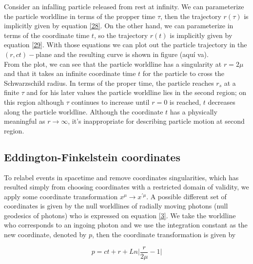 \documentclass[letterpaper,11pt,onecolumn]{article}
\begin{document}
Consider an infalling particle released from rest at infinity. We can parameterize the particle worldline in terms of the propper time $\tau$, then the trajectory $r(\tau)$ is implicitly given by equation \ref{28}. On the other hand, we can parameterize in terms of the coordinate time $t$, so the trajectory $r(t)$ is implicitly given by equation \ref{29}. With those equations we can plot out the particle trajectory in the $(r,ct)-$plane and the resulting curve is shown in figure (aquí va). \\
From the plot, we can see that the particle worldline has a singularity at $r=2\mu$ and that it takes an infinite coordinate time $t$ for the particle
to cross the Schwarzschild radius. In terms of the proper time, the particle reaches $r_s$ at a finite $\tau$ and for his later values the particle worldline lies in the second region; on this region although $\tau$ continues to increase until $r=0$ is reached,  $t$ decreases along the particle worldline. Although the coordinate $t$ has a physically meaningful as $r\rightarrow \infty$, it's inappropriate for describing particle motion at second region.

\subsection{Eddington-Finkelstein coordinates}

To relabel events in spacetime and remove coordinates singularities, which has resulted simply from choosing coordinates with a restricted domain of validity, we apply some coordinate transformation $x^{\mu}\rightarrow x^{'\mu}$. A possible different set of coordinates is given by the null worldlines of radially moving photons (null geodesics of photons) who is expressed on equation \ref{3}. We take the worldline who corresponds to an ingoing photon and we use the integration constant as the new coordinate, denoted by $p$, then the coordinate transformation is given by 

\begin{equation}
    p= ct + r + Ln\Big| \frac{r}{2\mu}-1 \Big|\label{4}
\end{equation}
\end{document}
